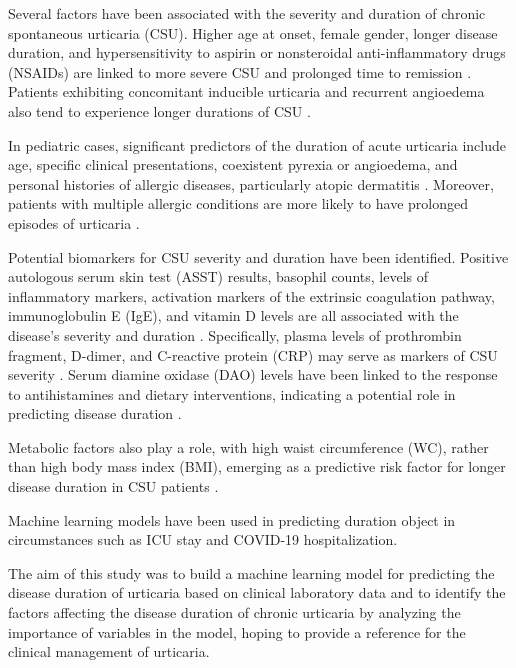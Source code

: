 \documentclass[preprint,12pt,authoryear]{elsarticle}
\begin{document}
Several factors have been associated with the severity and duration of chronic spontaneous urticaria (CSU). Higher age at onset, female gender, longer disease duration, and hypersensitivity to aspirin or nonsteroidal anti-inflammatory drugs (NSAIDs) are linked to more severe CSU and prolonged time to remission \citep{SanchezBorges2017Factors,Rabelo-Filardi2013Parameters}. 
Patients exhibiting concomitant inducible urticaria and recurrent angioedema also tend to experience longer durations of CSU \citep{SanchezBorges2017Factors, Curto-Barredo2018Clinical}.

In pediatric cases, significant predictors of the duration of acute urticaria include age, specific clinical presentations, coexistent pyrexia or angioedema, and personal histories of allergic diseases, particularly atopic dermatitis \citep{Lin2011Predictive}. Moreover, patients with multiple allergic conditions are more likely to have prolonged episodes of urticaria \citep{Lin2011Predictive}.

Potential biomarkers for CSU severity and duration have been identified. Positive autologous serum skin test (ASST) results, basophil counts, levels of inflammatory markers, activation markers of the extrinsic coagulation pathway, immunoglobulin E (IgE), and vitamin D levels are all associated with the disease's severity and duration \citep{SanchezBorges2017Factors,Rabelo-Filardi2013Parameters}. Specifically, plasma levels of prothrombin fragment, D-dimer, and C-reactive protein (CRP) may serve as markers of CSU severity \citep{Rabelo-Filardi2013Parameters}. Serum diamine oxidase (DAO) levels have been linked to the response to antihistamines and dietary interventions, indicating a potential role in predicting disease duration \citep{Chiang2022Predictors}.

Metabolic factors also play a role, with high waist circumference (WC), rather than high body mass index (BMI), emerging as a predictive risk factor for longer disease duration in CSU patients \citep{Kim2021High}.

Machine learning models have been used in predicting duration object in circumstances such as ICU stay and COVID-19 hospitalization\citep{Wu2021Predicting, Ghosh2022An, Etu2022Prediction}. 

The aim of this study was to build a machine learning model for predicting the disease duration of urticaria based on clinical laboratory data and to identify the factors affecting the disease duration of chronic urticaria by analyzing the importance of variables in the model, hoping to provide a reference for the clinical management of urticaria.
\end{document}

